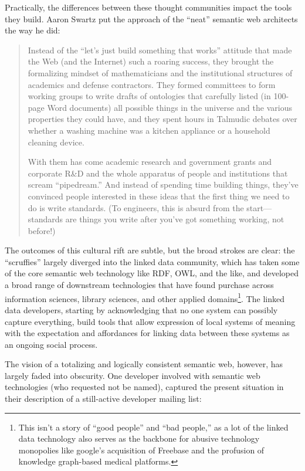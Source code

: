 \documentclass[10pt]{tufte-book}
\begin{document}
Practically, the differences between these thought communities impact
the tools they build. Aaron Swartz put the approach of the ``neat''
semantic web architects the way he did:

\begin{quote}
Instead of the ``let's just build something that works'' attitude that
made the Web (and the Internet) such a roaring success, they brought the
formalizing mindset of mathematicians and the institutional structures
of academics and defense contractors. They formed committees to form
working groups to write drafts of ontologies that carefully listed (in
100-page Word documents) all possible things in the universe and the
various properties they could have, and they spent hours in Talmudic
debates over whether a washing machine was a kitchen appliance or a
household cleaning device.

With them has come academic research and government grants and corporate
R\&D and the whole apparatus of people and institutions that scream
``pipedream.'' And instead of spending time building things, they've
convinced people interested in these ideas that the first thing we need
to do is write standards. (To engineers, this is absurd from the
start---standards are things you write after you've got something
working, not before!) \citep{swartzAaronSwartzProgrammable2013} 
\end{quote}

The outcomes of this cultural rift are subtle, but the broad strokes are
clear: the ``scruffies'' largely diverged into the linked data
community, which has taken some of the core semantic web technology like
RDF, OWL, and the like, and developed a broad range of downstream
technologies that have found purchase across information sciences,
library sciences, and other applied domains\footnote{This isn't a story
  of ``good people'' and ``bad people,'' as a lot of the linked data
  technology also serves as the backbone for abusive technology
  monopolies like google's acquisition of Freebase \citep{iainFreebaseDeadLong2019}  and the profusion of knowledge
  graph-based medical platforms.}. The linked data developers, starting
by acknowledging that no one system can possibly capture everything,
build tools that allow expression of local systems of meaning with the
expectation and affordances for linking data between these systems as an
ongoing social process.

The vision of a totalizing and logically consistent semantic web,
however, has largely faded into obscurity. One developer involved with
semantic web technologies (who requested not be named), captured the
present situation in their description of a still-active developer
mailing list:
\end{document}
